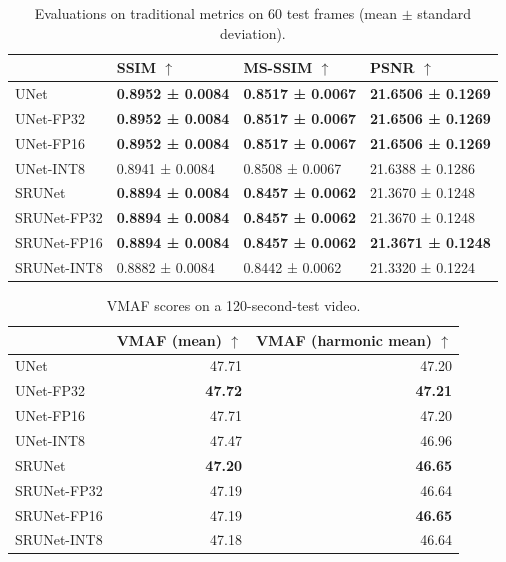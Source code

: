 \begin{table}[t]
\begin{tabular}{llll}
\toprule
{} & SSIM $\uparrow$ & MS-SSIM $\uparrow$ & PSNR $\uparrow$ \\
\midrule
UNet        &  \textbf{0.8952 ± 0.0084} &  \textbf{0.8517 ± 0.0067} &  \textbf{21.6506 ± 0.1269} \\
UNet-FP32   &  \textbf{0.8952 ± 0.0084} &  \textbf{0.8517 ± 0.0067} &  \textbf{21.6506 ± 0.1269} \\
UNet-FP16   &  \textbf{0.8952 ± 0.0084} &  \textbf{0.8517 ± 0.0067} &  \textbf{21.6506 ± 0.1269} \\
UNet-INT8   &  0.8941 ± 0.0084 &  0.8508 ± 0.0067 &  21.6388 ± 0.1286 \\
\midrule
SRUNet      &  \textbf{0.8894 ± 0.0084} &  \textbf{0.8457 ± 0.0062} &  21.3670 ± 0.1248 \\
SRUNet-FP32 &  \textbf{0.8894 ± 0.0084} &  \textbf{0.8457 ± 0.0062} &  21.3670 ± 0.1248 \\
SRUNet-FP16 &  \textbf{0.8894 ± 0.0084} &  \textbf{0.8457 ± 0.0062} &  \textbf{21.3671 ± 0.1248} \\
SRUNet-INT8 &  0.8882 ± 0.0084 &  0.8442 ± 0.0062 &  21.3320 ± 0.1224 \\
\bottomrule
\end{tabular}
\caption{Evaluations on traditional metrics on 60 test frames (mean $\pm$ standard deviation).}
\label{tab:traditional-metrics}
\end{table}

\begin{table}[t]
\begin{tabular}{lrr}
\toprule
{} &       VMAF (mean) $\uparrow$ &  VMAF (harmonic mean) $\uparrow$ \\
\midrule
UNet        &  47.71 &      47.20 \\
UNet-FP32   &  \textbf{47.72} &      \textbf{47.21} \\
UNet-FP16   &  47.71 &      47.20 \\
UNet-INT8   &  47.47 &      46.96 \\
\midrule
SRUNet      &  \textbf{47.20} &      \textbf{46.65} \\
SRUNet-FP32 &  47.19 &      46.64 \\
SRUNet-FP16 &  47.19 &      \textbf{46.65} \\
SRUNet-INT8 &  47.18 &      46.64 \\
\bottomrule
\end{tabular}
\caption{VMAF scores on a 120-second-test video.}
\label{tab:vmaf}
\end{table}


